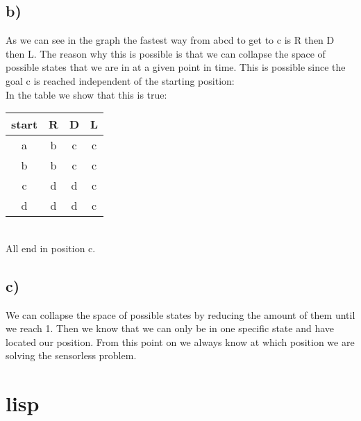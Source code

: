\documentclass[12pt,a4paper]{scrartcl}
\begin{document}
	\subsection*{b)}
	As we can see in the graph the fastest way from abcd to get to c is R then D then L. The reason why this is possible is that we can collapse the space of possible states that we are in at a given point in time. This is possible since the goal c is reached independent of the starting position:\\
	In the table we show that this is true:\\
	\begin{tabular}{c | c | c | c }
		start & R & D & L \\ \hline
		a & b & c & c \\
		b & b & c & c  \\
		c & d & d & c \\
		d & d & d & c 
	\end{tabular}\\
	All end in position c.
	\subsection*{c)}
	We can collapse the space of possible states by reducing the amount of them until we reach 1. Then we know that we can only be in one specific state and have located our position. From this point on we always know at which position we are solving the sensorless problem.
\section{lisp}
	
\end{document}

